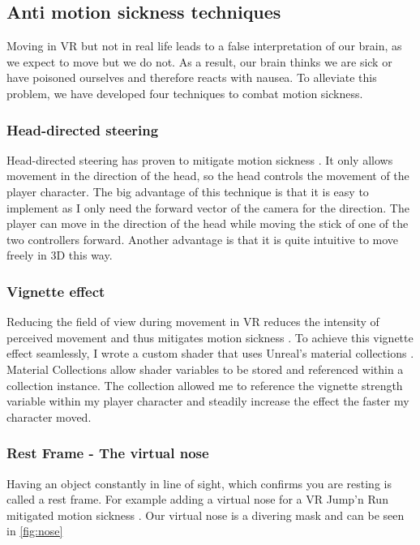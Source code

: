\documentclass[letterpaper, 10 pt, conference]{ieeeconf}  %
\begin{document}
\subsection{Anti motion sickness techniques}

Moving in VR but not in real life leads to a false interpretation of our brain, as we expect to move but we do not.
As a result, our brain thinks we are sick or have poisoned ourselves and therefore reacts with nausea.
To alleviate this problem, we have developed four techniques to combat motion sickness.

\subsubsection{Head-directed steering}

Head-directed steering has proven to mitigate motion sickness \cite{jerald2017vr}.
It only allows movement in the direction of the head, so the head controls the movement of the player character.
The big advantage of this technique is that it is easy to implement as I only need the forward vector of the camera for the direction.
The player can move in the direction of the head while moving the stick of one of the two controllers forward.
Another advantage is that it is quite intuitive to move freely in 3D this way.

\subsubsection{Vignette effect}

Reducing the field of view during movement in VR reduces the intensity of perceived movement and thus mitigates motion sickness \cite{basting2017effectiveness}.
To achieve this vignette effect seamlessly, I wrote a custom shader that uses Unreal's material collections \cite{collections}.
Material Collections allow shader variables to be stored and referenced within a collection instance. 
The collection allowed me to reference the vignette strength variable within my player character and steadily increase the effect the faster my character moved.

\subsubsection {Rest Frame - The virtual nose}

Having an object constantly in line of sight, which confirms you are resting is called a rest frame.
For example adding a virtual nose for a VR Jump'n Run mitigated motion sickness \cite{wienrich2018virtual}.
Our virtual nose is a divering mask and can be seen in \ref{fig:nose}
\end{document}
